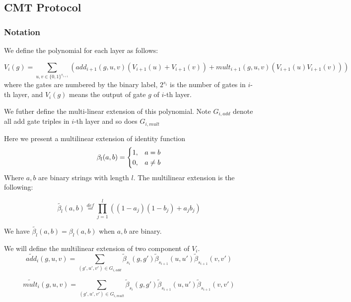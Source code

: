 
\subsection{CMT Protocol}
\label{subsec::CMT}
\subsubsection{Notation}
We define the polynomial for each layer as follows:
\begin{definition} 
	$$V_i(g)=\sum_{u, v \in \{0,1\}^{s_{i+1}}}(add_{i+1}(g,u,v)(V_{i+1}(u)+V_{i+1}(v))+mult_{i+1}(g,u,v)(V_{i+1}(u)V_{i+1}(v)))$$
	where the gates are numbered by the binary label, $2^{s_i}$ is the number of gates in $i$-th layer, and $V_i(g)$ means the output of gate $g$ of $i$-th layer.
\end{definition}

We futher define the multi-linear extension of this polynomial. Note $G_{i,add}$ denote all add gate triples in $i$-th layer and so does $G_{i,mult}$


\begin{definition}
Here we present a multilinear extension of identity function
\begin{eqnarray}\beta_{l}(a, b)=
	\begin{cases}
	1, &a=b\cr 0, &a\neq b
	\end{cases}
\end{eqnarray}
Where $a, b$ are binary strings with length $l$. The multilinear extension is the following:

$$\tilde{\beta_{l}}(a,b)\overset{def}{=}\prod_{j=1}^{l}((1-a_{j})(1-b_{j})+a_{j}b_{j})$$

We have $\tilde{\beta_{l}}(a,b)=\beta_{l}(a, b)$ when $a, b$ are binary.
\end{definition}

\begin{definition}
We will define the multilinear extension of two component of $V_i$.
$$\tilde{add}_{i}(g, u, v)=\sum_{(g', u', v') \in G_{i, add}}\tilde{\beta}_{s_i}(g, g')\tilde{\beta}_{s_{i+1}}(u, u')\tilde{\beta}_{s_{i+1}}(v, v')$$

$$\tilde{mult}_{i}(g, u, v)=\sum_{(g', u', v') \in G_{i, mult}}\tilde{\beta}_{s_i}(g, g')\tilde{\beta}_{s_{i+1}}(u, u')\tilde{\beta}_{s_{i+1}}(v, v')$$
\end{definition}

